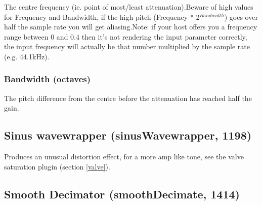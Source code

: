\documentclass[11pt]{article}
\begin{document}
The centre frequency (ie. point of most/least attenuation).Beware of high values for Frequency and Bandwidth, if the high pitch (Frequency * 2$^{Bandwidth}$) goes over half the sample rate you will get aliasing.Note: if your host offers you a frequency range between 0 and 0.4 then it's not rendering the input parameter correctly, the input frequency will actually be that number multiplied by the sample rate (e.g. 44.1kHz).\subsubsection*{Bandwidth (octaves)}
The pitch difference from the centre before the attenuation has reached half the gain.\subsection{Sinus wavewrapper (sinusWavewrapper, 1198)\label{sinusWavewrapper}\label{id1198}}
Produces an unusual distortion effect, for a more amp like tone, see the valve saturation plugin (section \ref{valve}).\subsection{Smooth Decimator (smoothDecimate, 1414)\label{smoothDecimate}\label{id1414}}
\end{document}
